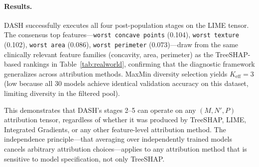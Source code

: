 \documentclass[10pt]{article}
\newcommand{\dash}{\textsc{DASH}}
\begin{document}
\paragraph{Results.}
\dash{} successfully executes all four post-population stages on the
LIME tensor. The consensus top features---\texttt{worst concave points}
(0.104), \texttt{worst texture} (0.102), \texttt{worst area} (0.086),
\texttt{worst perimeter} (0.073)---draw from the same clinically
relevant feature families (concavity, area, perimeter) as the
TreeSHAP-based rankings in Table~\ref{tab:realworld}, confirming that
the diagnostic framework generalizes across attribution methods.
MaxMin diversity selection yields $K_{\text{eff}} = 3$ (low because all
30 models achieve identical validation accuracy on this dataset,
limiting diversity in the filtered pool).

This demonstrates that \dash{}'s stages 2--5 can operate on any
$(M, N', P)$ attribution tensor, regardless of whether it was produced
by TreeSHAP, LIME, Integrated Gradients, or any other feature-level
attribution method. The independence principle---that averaging over
independently trained models cancels arbitrary attribution
choices---applies to any attribution method that is sensitive to model
specification, not only TreeSHAP.
\end{document}
